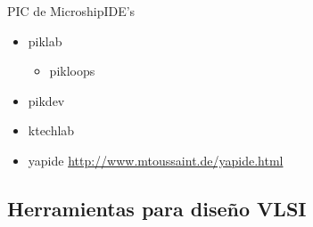 \documentclass{beamer}
\begin{document}
\begin{frame}{PIC de Microship}{IDE's}
  \begin{itemize}
  \item piklab
    \begin{itemize}
    \item pikloops
    \end{itemize}
  \item pikdev
  \item ktechlab
  \item yapide \url{http://www.mtoussaint.de/yapide.html}
  \end{itemize}
\end{frame}

\subsection[Diseño VLSI]{Herramientas para diseño VLSI}




\end{document}
